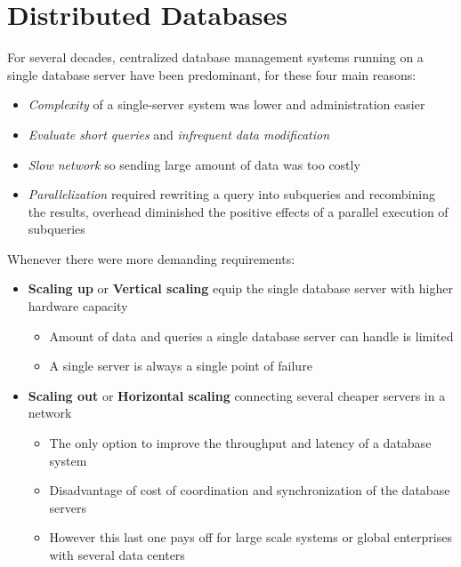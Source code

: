 \chapter{Distributed Databases}
For several decades, centralized database management systems running on a single database server have been predominant, for these four main reasons:
\begin{itemize}
    \item \textit{Complexity} of a single-server system was lower and administration easier
    \item \textit{Evaluate short queries} and \textit{infrequent data modification}
    \item \textit{Slow network} so sending large amount of data was too costly
    \item \textit{Parallelization} required rewriting a query into subqueries and recombining the results, overhead diminished the positive effects of a parallel execution of subqueries
\end{itemize}
Whenever there were more demanding requirements:
\begin{itemize}
    \item \textbf{Scaling up} or \textbf{Vertical scaling} equip the single database server with higher hardware capacity
    \begin{itemize}
        \item Amount of data and queries a single database server can handle is limited
        \item A single server is always a single point of failure
    \end{itemize}
    \item \textbf{Scaling out} or \textbf{Horizontal scaling} connecting several cheaper servers in a network
    \begin{itemize}
        \item The only option to improve the throughput and latency of a database system
        \item Disadvantage of cost of coordination and synchronization of the database servers
        \item However this last one pays off for large scale systems or global enterprises with several data centers
    \end{itemize}
\end{itemize}

